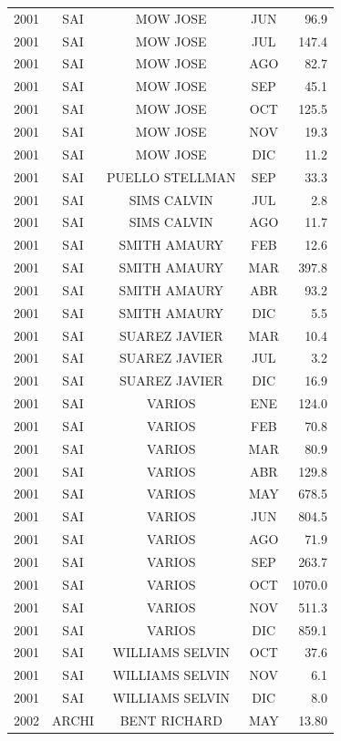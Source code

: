 \documentclass[12pt,]{article}
\begin{document}
\begin{table}[ht]
{\begin{tabular}{lcccr}
  2001 & SAI & MOW JOSE & JUN & 96.9 \\ 
  2001 & SAI & MOW JOSE & JUL & 147.4 \\ 
  2001 & SAI & MOW JOSE & AGO & 82.7 \\ 
  2001 & SAI & MOW JOSE & SEP & 45.1 \\ 
  2001 & SAI & MOW JOSE & OCT & 125.5 \\ 
  2001 & SAI & MOW JOSE & NOV & 19.3 \\ 
  2001 & SAI & MOW JOSE & DIC & 11.2 \\ 
  2001 & SAI & PUELLO STELLMAN & SEP & 33.3 \\ 
  2001 & SAI & SIMS CALVIN & JUL & 2.8 \\ 
  2001 & SAI & SIMS CALVIN & AGO & 11.7 \\ 
  2001 & SAI & SMITH AMAURY & FEB & 12.6 \\ 
  2001 & SAI & SMITH AMAURY & MAR & 397.8 \\ 
  2001 & SAI & SMITH AMAURY & ABR & 93.2 \\ 
  2001 & SAI & SMITH AMAURY & DIC & 5.5 \\ 
  2001 & SAI & SUAREZ JAVIER & MAR & 10.4 \\ 
  2001 & SAI & SUAREZ JAVIER & JUL & 3.2 \\ 
  2001 & SAI & SUAREZ JAVIER & DIC & 16.9 \\ 
  2001 & SAI & VARIOS & ENE & 124.0 \\ 
  2001 & SAI & VARIOS & FEB & 70.8 \\ 
  2001 & SAI & VARIOS & MAR & 80.9 \\ 
  2001 & SAI & VARIOS & ABR & 129.8 \\ 
  2001 & SAI & VARIOS & MAY & 678.5 \\ 
  2001 & SAI & VARIOS & JUN & 804.5 \\ 
  2001 & SAI & VARIOS & AGO & 71.9 \\ 
  2001 & SAI & VARIOS & SEP & 263.7 \\ 
  2001 & SAI & VARIOS & OCT & 1070.0 \\ 
  2001 & SAI & VARIOS & NOV & 511.3 \\ 
  2001 & SAI & VARIOS & DIC & 859.1 \\ 
  2001 & SAI & WILLIAMS SELVIN & OCT & 37.6 \\ 
  2001 & SAI & WILLIAMS SELVIN & NOV & 6.1 \\ 
  2001 & SAI & WILLIAMS SELVIN & DIC & 8.0 \\ 
  2002 & ARCHI & BENT RICHARD & MAY & 13.80 \\ 

\end{tabular}}
\end{table}
\end{document}
